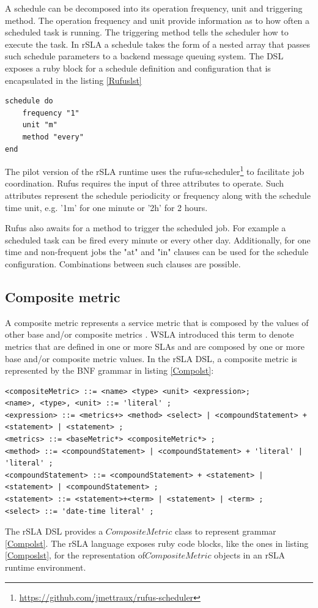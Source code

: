 \documentclass{llncs}
\begin{document}
A schedule can be decomposed into its operation frequency, unit and triggering method. The operation frequency and unit provide information as to how often a scheduled task is running. The triggering method tells the scheduler how to execute the task. In rSLA a schedule takes the form of a nested array that passes such schedule parameters to a backend message queuing system. The DSL exposes a ruby block for a schedule definition and configuration that is encapsulated in the listing \ref{Rufuslst}

\begin{lstlisting}[breaklines, firstnumber=auto, caption= rSLA schedule definition, label=Rufuslst]
schedule do
	frequency "1"
    unit "m"
    method "every"
end
\end{lstlisting}

The pilot version of the rSLA runtime uses the rufus-scheduler\footnote{\url{https://github.com/jmettraux/rufus-scheduler}} to facilitate job coordination. Rufus requires the input of three attributes to operate. Such attributes represent the schedule periodicity or frequency along with the schedule time unit, e.g. '1m' for one minute or '2h' for 2 hours. 

Rufus also awaits for a method to trigger the scheduled job. For example a scheduled task can be fired every minute or every other day. Additionally, for one time and non-frequent jobs the "at" and "in" clauses can be used for the schedule configuration. Combinations between such clauses are possible.

\subsection{Composite metric}\label{composite}

A composite metric represents a service metric that is composed by the values of other base and/or composite metrics \cite{wsla}. WSLA introduced this term to denote metrics that are defined in one or more SLAs and are composed by one or more base and/or composite metric values. 
In the rSLA DSL, a composite metric is represented by the BNF grammar in listing \ref{Compolst}:

\begin{lstlisting}[breaklines, firstnumber=auto, caption= $<CompositeMetric>$ BNF grammar, label =Compolst]
<compositeMetric> ::= <name> <type> <unit> <expression>;
<name>, <type>, <unit> ::= 'literal' ;
<expression> ::= <metrics+> <method> <select> | <compoundStatement> + <statement> | <statement> ;
<metrics> ::= <baseMetric*> <compositeMetric*> ; 
<method> ::= <compoundStatement> | <compoundStatement> + 'literal' | 'literal' ;
<compoundStatement> ::= <compoundStatement> + <statement> | <statement> | <compoundStatement> ;
<statement> ::= <statement>+<term> | <statement> | <term> ;
<select> ::= 'date-time literal' ;
\end{lstlisting}
The rSLA DSL provides a $CompositeMetric$ class to represent grammar \ref{Compolst}. The rSLA language exposes ruby code blocks, like the ones in listing \ref{Composlst}, for the representation of$CompositeMetric$ objects in an rSLA runtime environment.
\end{document}
